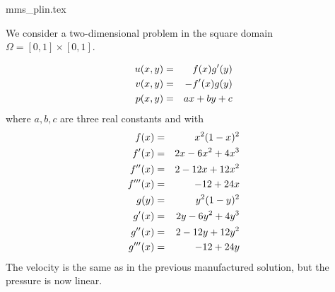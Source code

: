 \begin{flushright} {\tiny {\color{gray} mms\_plin.tex}} \end{flushright}

We consider a two-dimensional problem 
in the square domain $\Omega=[0,1]\times[0,1]$.

\begin{eqnarray}
u(x,y) 
&=& f(x) g'(y) \nonumber\\
v(x,y) 
&=& -f'(x) g(y) \nonumber\\
p(x,y) &=& ax+by+c \nonumber 
\end{eqnarray}
where $a,b,c$ are three real constants and 
with
\begin{eqnarray}
f(x) &=&  x^2(1- x)^2 \nonumber\\
f'(x) &=& 2x -6x^2 +4 x^3 \nonumber\\
f''(x) &=& 2-12x+12x^2 \nonumber\\
f'''(x) &=& -12+24x \nonumber\\
g(y) &=& y^2 (1 - y)^2 \nonumber\\
g'(x) &=& 2y -6y^2 +4 y^3 \nonumber\\
g''(x) &=& 2-12y+12y^2 \nonumber\\
g'''(x) &=& -12+24y \nonumber
\end{eqnarray}
The velocity is the same as in the previous manufactured solution, but the 
pressure is now linear.

